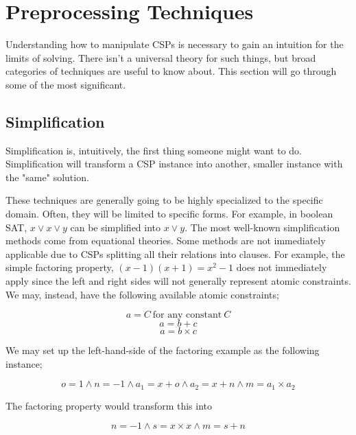 \section{Preprocessing Techniques}\label{sec:preprocessing}
Understanding how to manipulate CSPs is necessary to gain an intuition for the limits of solving. There isn't a universal theory for such things, but broad categories of techniques are useful to know about. This section will go through some of the most significant.

\subsection{Simplification}\label{sec:simplification}
Simplification is, intuitively, the first thing someone might want to do. Simplification will transform a CSP instance into another, smaller instance with the "same" solution.

These techniques are generally going to be highly specialized to the specific domain. Often, they will be limited to specific forms. For example, in boolean SAT, $x \vee x \vee y$ can be simplified into $x \vee y$. The most well-known simplification methods come from equational theories. Some methods are not immediately applicable due to CSPs splitting all their relations into clauses. For example, the simple factoring property, $(x-1) (x+1) = x^2 - 1$ does not immediately apply since the left and right sides will not generally represent atomic constraints. We may, instead, have the following available atomic constraints;

\begin{equation}
    a = C\ \text{for any constant}\ C
\end{equation}
\begin{equation}
    a = b + c
\end{equation}
\begin{equation}
    a = b \times c
\end{equation}

We may set up the left-hand-side of the factoring example as the following instance;

\begin{equation}
    o = 1 \wedge n = -1 \wedge a_1 = x + o \wedge a_2 = x + n \wedge m = a_1 \times a_2
\end{equation}

The factoring property would transform this into

\begin{equation}
    n = -1 \wedge s = x \times x \wedge m = s + n
\end{equation}

